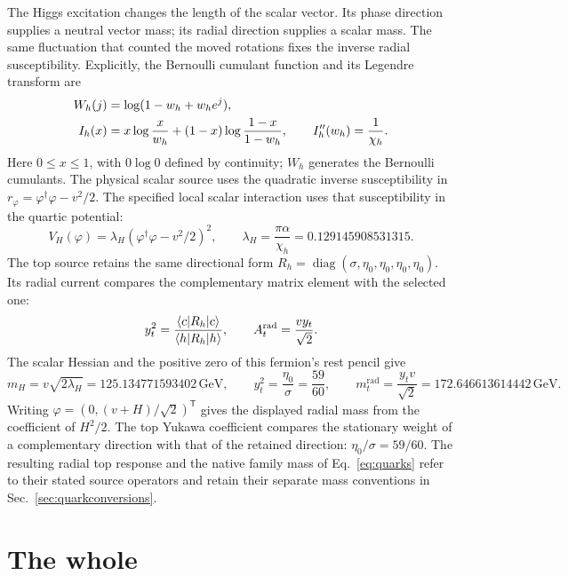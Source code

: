 \documentclass[aps,prx,onecolumn,10pt,notitlepage,nofootinbib,longbibliography]{revtex4-2}
\numberwithin{equation}{section}
\numberwithin{table}{section}
\newcommand{\diag}{\operatorname{diag}}
\newcommand{\GeV}{\,\mathrm{GeV}}
\begin{document}
The Higgs excitation changes the length of the scalar vector. Its phase direction supplies a neutral vector mass; its radial direction supplies a scalar mass. The same fluctuation that counted the moved rotations fixes the inverse radial susceptibility. Explicitly, the Bernoulli cumulant function and its Legendre transform are
\begin{align}
 W_h(j)&=\log(1-w_h+w_he^j),\notag\\
 I_h(x)&=x\log\frac{x}{w_h}+(1-x)\log\frac{1-x}{1-w_h},\qquad
 I_h''(w_h)=\frac1{\chi_h}.
 \label{eq:radialsusceptibility}
\end{align}
Here $0\leq x\leq1$, with $0\log0$ defined by continuity; $W_h$ generates the Bernoulli cumulants. The physical scalar source uses the quadratic inverse susceptibility in $r_\varphi=\varphi^\dagger\varphi-v^2/2$. The specified local scalar interaction uses that susceptibility in the quartic potential:
\begin{equation}
 V_H(\varphi)=\lambda_H(\varphi^\dagger\varphi-v^2/2)^2,
 \qquad \lambda_H=\frac{\pi\alpha}{\chi_h}=0.129145908531315.
\end{equation}
The top source retains the same directional form $R_h=\diag(\sigma,\eta_0,\eta_0,\eta_0,\eta_0)$. Its radial current compares the complementary matrix element with the selected one:
\begin{equation}
 y_t^2=\frac{\langle c|R_h|c\rangle}{\langle h|R_h|h\rangle},\qquad
 A_t^{\rm rad}=\frac{v y_t}{\sqrt2}.
 \label{eq:radialfermionsource}
\end{equation}
The scalar Hessian and the positive zero of this fermion's rest pencil give
\begin{equation}
 m_H=v\sqrt{2\lambda_H}=125.134771593402\GeV,\qquad
 y_t^2=\frac{\eta_0}{\sigma}=\frac{59}{60},\qquad
 m_t^{\mathrm{rad}}=\frac{y_tv}{\sqrt2}=172.646613614442\GeV.
 \label{eq:radial}
\end{equation}
Writing $\varphi=(0,(v+H)/\sqrt2)^{\mathsf T}$ gives the displayed radial mass from the coefficient of $H^2/2$. The top Yukawa coefficient compares the stationary weight of a complementary direction with that of the retained direction: $\eta_0/\sigma=59/60$. The resulting radial top response and the native family mass of Eq.~\eqref{eq:quarks} refer to their stated source operators and retain their separate mass conventions in Sec.~\ref{sec:quarkconversions}.

\section{The whole}
\label{sec:step-eight}
\label{sec:whole}
\end{document}

